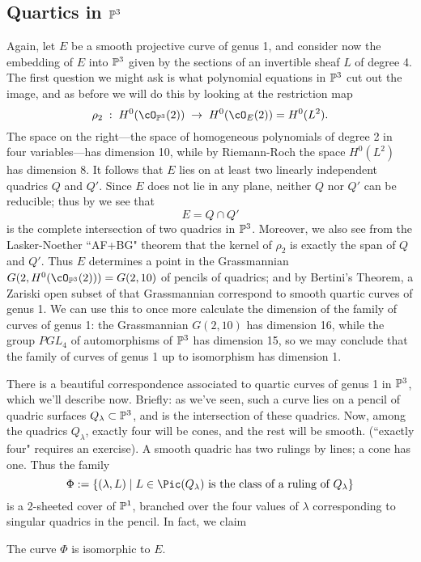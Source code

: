 \subsection{Quartics in $\PP^3$} 

Again, let $E$ be a smooth projective curve of genus 1, and consider now the embedding of $E$ into $\PP^3$ given by the sections of an invertible sheaf $L$ of degree 4. The first question we might ask is what polynomial equations in $\PP^3$ cut out the image, and as before we will do this by looking at the restriction map
$$
\rho_2 \;  : \; H^0(\cO_{\PP^3}(2)) \; \to \; H^0(\cO_{E}(2)) = H^0(L^2).
$$
The space on the right---the space of homogeneous polynomials of degree 2 in four variables---has dimension 10, while by Riemann-Roch the space $H^0(L^2)$ has dimension 8. It follows that $E$ lies on at least two linearly independent quadrics $Q$ and $Q'$. Since $E$ does not lie in any plane, neither $Q$ nor $Q'$ can be reducible; thus by \bt we see that
$$
E = Q \cap Q'
$$
is the complete intersection of two quadrics in $\PP^3$. Moreover, we also see from the Lasker-Noether ``AF+BG" theorem that the kernel of $\rho_2$ is exactly the span of $Q$ and $Q'$. Thus $E$ determines a point in the Grassmannian $G(2, H^0(\cO_{\PP^3}(2))) = G(2, 10)$ of pencils of quadrics; and by Bertini's Theorem, a Zariski open subset of that Grassmannian correspond to smooth quartic curves of genus 1. We can use this to once more calculate the dimension of the family of curves of genus 1: the Grassmannian $G(2,10)$ has dimension 16, while the group $PGL_4$ of automorphisms of $\PP^3$ has dimension 15, so we may conclude that the family of curves of genus 1 up to isomorphism has dimension 1.

There is a beautiful correspondence associated to quartic curves of genus 1 in $\PP^3$, which we'll describe now. Briefly: as we've seen, such a curve lies on a pencil of quadric surfaces $Q_\lambda \subset \PP^3$, and is the intersection of these quadrics. Now, among the quadrics $Q_\lambda$, exactly four will be cones, and the rest will be smooth. (``exactly four" requires an exercise). A smooth quadric has two rulings by lines; a cone has one. Thus the family
$$
\Phi := \{ (\lambda, L) \mid L \in \Pic(Q_\lambda) \text{ is the class of a ruling of } Q_\lambda \}
$$
is a 2-sheeted cover of $\PP^1$, branched over the four values of $\lambda$ corresponding to singular quadrics in the pencil. In fact, we claim

\begin{proposition}\label{rulings on pencil}
The curve $\Phi$ is isomorphic to $E$.
\end{proposition} 

